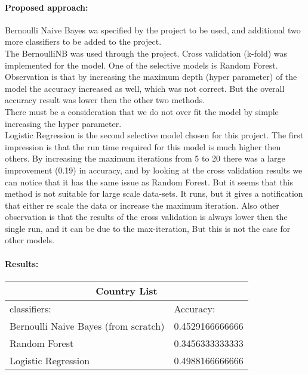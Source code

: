 \documentclass[12pt]{report}
\begin{document}
	\paragraph{Proposed approach:}
	Bernoulli Naive Bayes wa specified by the project to be used, and additional two more classifiers to be added to the project.\\
	The BernoulliNB was used through the project. Cross validation (k-fold) was implemented for the model. 
	One of the selective models is Random Forest. Observation is that by increasing the maximum depth (hyper parameter) of the model the accuracy increased as well, which was not correct. But the overall accuracy result was lower then the other two methods. \\
	There must be a consideration that we do not over fit the model by simple increasing the hyper parameter. \\
	Logistic Regression is the second selective model chosen for this project. The first impression is that the run time required for this model is much higher then others. By increasing the maximum iterations from 5 to 20 there was a large improvement (0.19) in accuracy, and by looking at the cross validation results we can notice that it has the same issue as Random Forest. But it seems that this method is not suitable for large scale data-sets. It runs, but it gives a notification that either re scale the data or increase the maximum iteration. Also other observation is that the results of the cross validation is always lower then the single run, and it can be due to the max-iteration, But this is not the case for other models. \\
	
	
	\paragraph{Results:}
	
	\begin{center}
		\begin{tabular}{ |p{3cm}||p{3cm}| }
			\hline
			\multicolumn{2}{|c|}{Country List} \\
			\hline
			classifiers:& Accuracy:\\
			\hline
			Bernoulli Naive Bayes (from scratch)   & 0.4529166666666\\
			Random Forest&   0.3456333333333\\
			Logistic Regression &0.4988166666666\\
			\hline
		\end{tabular}
	\end{center}
\end{document}

